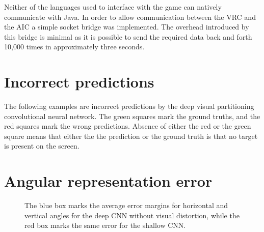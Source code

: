 Neither of the languages used to interface with the game can natively communicate with Java. In order to allow communication between the VRC and the AIC a simple socket bridge was implemented. The overhead introduced by this bridge is minimal as it is possible to send the required data back and forth 10,000 times in approximately three seconds.

\section{Incorrect predictions}
\label{sec:incorrectpredictions}
The following examples are incorrect predictions by the deep visual partitioning convolutional neural network. The green squares mark the ground truths, and the red squares mark the wrong predictions. Absence of either the red or the green square means that either the the prediction  or the ground truth is that no target is present on the screen.

\begin{figure}[H]
	\begin{center}
	\begin{scriptsize}
		\sffamily
		\def\svgwidth{0.95\textwidth}
		
	\end{scriptsize}
	\end{center}
\end{figure}


\begin{figure}[H]
	\begin{center}
	\begin{scriptsize}
		\sffamily
		\def\svgwidth{0.95\textwidth}
		
	\end{scriptsize}
	\end{center}
\end{figure}

\section{Angular representation error}
\label{sec:angular-error}
\begin{figure}[H]
	\begin{center}
	\begin{scriptsize}
		\sffamily
		\def\svgwidth{1\textwidth}
		
	\end{scriptsize}
	\end{center}
	\caption[AR mean error visualised]{The blue box marks the average error margins for horizontal and vertical angles for the deep CNN without visual distortion, while the red box marks the same error for the shallow CNN.}
	\label{fig:angularerror}
\end{figure}

